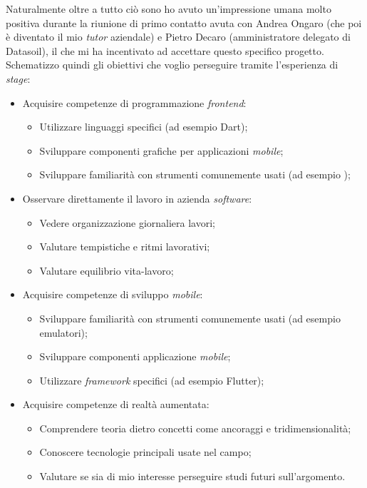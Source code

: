 Naturalmente oltre a tutto ciò sono ho avuto un'impressione umana molto positiva durante la riunione di primo contatto avuta con Andrea Ongaro (che poi è diventato il mio \textit{tutor} aziendale) e Pietro Decaro (amministratore delegato di Datasoil), il che mi ha incentivato ad accettare questo specifico progetto.\\
Schematizzo quindi gli obiettivi che voglio perseguire tramite l'esperienza di \textit{stage}:
\begin{itemize}
    \item Acquisire competenze di programmazione \textit{frontend}:
        \begin{itemize}
            \item Utilizzare linguaggi specifici (ad esempio Dart);
            \item Sviluppare componenti grafiche per applicazioni \textit{mobile};
            \item Sviluppare familiarità con strumenti comunemente usati (ad esempio \vsc);
        \end{itemize}
    \item Osservare direttamente il lavoro in azienda \textit{software}:
        \begin{itemize}
            \item Vedere organizzazione giornaliera lavori;
            \item Valutare tempistiche e ritmi lavorativi;
            \item Valutare equilibrio vita-lavoro;
        \end{itemize}
    \item Acquisire competenze di sviluppo \textit{mobile}:
        \begin{itemize}
            \item Sviluppare familiarità con strumenti comunemente usati (ad esempio emulatori);
            \item Sviluppare componenti applicazione \textit{mobile};
            \item Utilizzare \textit{framework} specifici (ad esempio Flutter);
        \end{itemize}
    \item Acquisire competenze di realtà aumentata:
        \begin{itemize}
            \item Comprendere teoria dietro concetti come ancoraggi e tridimensionalità;
            \item Conoscere tecnologie principali usate nel campo;
            \item Valutare se sia di mio interesse perseguire studi futuri sull'argomento.
        \end{itemize}
\end{itemize}

